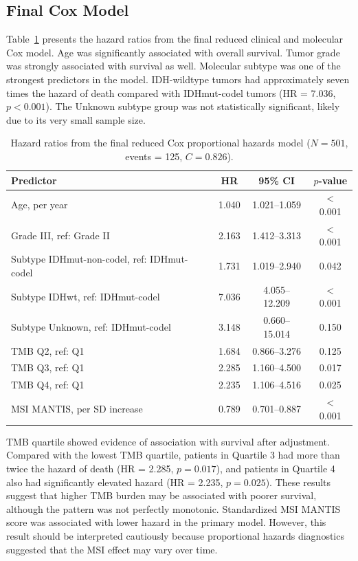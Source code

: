 \documentclass[paper=a4, fontsize=11pt]{scrartcl}
\numberwithin{equation}{section}		%
\numberwithin{figure}{section}			%
\numberwithin{table}{section}				%
\begin{document}
\subsection{Final Cox Model} 

Table~\ref{tab:final} presents the hazard ratios from the final reduced clinical and molecular Cox model. Age was significantly associated with overall survival. Tumor grade was strongly associated with survival as well. Molecular subtype was one of the strongest predictors in the model. IDH-wildtype tumors had approximately seven times the hazard of death compared with IDHmut-codel tumors (HR = 7.036, $p < 0.001$). The Unknown subtype group was not statistically significant, likely due to its very small sample size.

\begin{table}[H] 
\scriptsize
\centering 
\begin{tabular}{lccc} 
\toprule 
\textbf{Predictor} & \textbf{HR} & \textbf{95\% CI} & \textbf{$p$-value} \\ \midrule 
Age, per year & 1.040 & 1.021--1.059 & $<$0.001 \\ 
Grade III, ref: Grade II & 2.163 & 1.412--3.313 & $<$0.001 \\ 
Subtype IDHmut-non-codel, ref: IDHmut-codel & 1.731 & 1.019--2.940 & 0.042 \\ Subtype IDHwt, ref: IDHmut-codel & 7.036 & 4.055--12.209 & $<$0.001 \\ 
Subtype Unknown, ref: IDHmut-codel & 3.148 & 0.660--15.014 & 0.150 \\ 
TMB Q2, ref: Q1 & 1.684 & 0.866--3.276 & 0.125 \\ 
TMB Q3, ref: Q1 & 2.285 & 1.160--4.500 & 0.017 \\ 
TMB Q4, ref: Q1 & 2.235 & 1.106--4.516 & 0.025 \\ 
MSI MANTIS, per SD increase & 0.789 & 0.701--0.887 & $<$0.001 \\ 
\bottomrule 
\end{tabular} 
\caption{Hazard ratios from the final reduced Cox proportional hazards model ($N = 501$, events = 125, $C = 0.826$).} 
\label{tab:final} 
\end{table}

\noindent
TMB quartile showed evidence of association with survival after adjustment. Compared with the lowest TMB quartile, patients in Quartile 3 had more than twice the hazard of death (HR = 2.285, $p = 0.017$), and patients in Quartile 4 also had significantly elevated hazard (HR = 2.235, $p = 0.025$). These results suggest that higher TMB burden may be associated with poorer survival, although the pattern was not perfectly monotonic. Standardized MSI MANTIS score was associated with lower hazard in the primary model. However, this result should be interpreted cautiously because proportional hazards diagnostics suggested that the MSI effect may vary over time.
\end{document}
